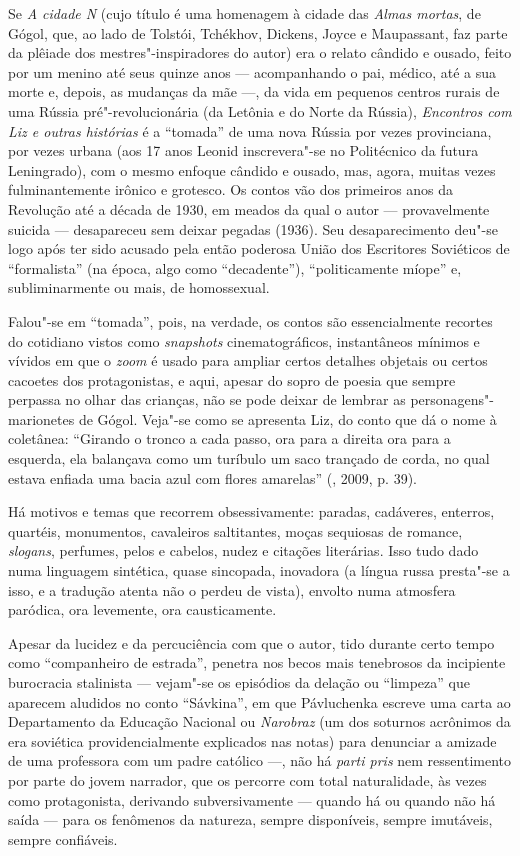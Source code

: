Se \emph{A cidade N} (cujo título é uma homenagem à cidade das
\emph{Almas mortas}, de Gógol, que, ao lado de Tolstói, Tchékhov, Dickens, Joyce e Maupassant, faz parte da plêiade dos
mestres"-inspiradores do autor) era o relato cândido e ousado, feito por
um menino até seus quinze anos --- acompanhando o pai, médico, até a sua
morte e, depois, as mudanças da mãe ---, da vida em pequenos centros
rurais de uma Rússia pré"-revolucionária (da Letônia e do Norte da
Rússia), \emph{Encontros com Liz e outras histórias} é a ``tomada'' de
uma nova Rússia por vezes provinciana, por vezes urbana (aos 17 anos
Leonid inscrevera"-se no Politécnico da futura Leningrado), com o mesmo
enfoque cândido e ousado, mas, agora, muitas vezes fulminantemente
irônico e grotesco. Os contos vão dos primeiros anos da Revolução até a
década de 1930, em meados da qual o autor --- provavelmente suicida ---
desapareceu sem deixar pegadas (1936). Seu desaparecimento deu"-se logo
após ter sido acusado pela então poderosa União dos Escritores
Soviéticos de ``formalista'' (na época, algo como ``decadente''),
``politicamente míope'' e, subliminarmente ou mais, de homossexual.

Falou"-se em ``tomada'', pois, na verdade, os contos são essencialmente
recortes do cotidiano vistos como \emph{snapshots} cinematográficos,
instantâneos mínimos e vívidos em que o \emph{zoom} é usado para ampliar
certos detalhes objetais ou certos cacoetes dos protagonistas, e aqui,
apesar do sopro de poesia que sempre perpassa no olhar das crianças, não
se pode deixar de lembrar as personagens"-marionetes de Gógol. Veja"-se
como se apresenta Liz, do conto que dá o nome à coletânea: ``Girando o
tronco a cada passo, ora para a direita ora para a esquerda, ela
balançava como um turíbulo um saco trançado de corda, no qual estava
enfiada uma bacia azul com flores amarelas'' (, 2009, p. 39).

Há motivos e temas que recorrem obsessivamente: paradas, cadáveres,
enterros, quartéis, monumentos, cavaleiros saltitantes, moças sequiosas
de romance, \emph{slogans}, perfumes, pelos e cabelos, nudez e citações
literárias. Isso tudo dado numa linguagem sintética, quase sincopada,
inovadora (a língua russa presta"-se a isso, e a tradução atenta não o
perdeu de vista), envolto numa atmosfera paródica, ora levemente, ora
causticamente.

Apesar da lucidez e da percuciência com que o autor, tido durante certo
tempo como ``companheiro de estrada'', penetra nos becos mais tenebrosos
da incipiente burocracia stalinista --- vejam"-se os episódios da delação
ou ``limpeza'' que aparecem aludidos no conto ``Sávkina'', em
que Pávluchenka escreve uma carta ao Departamento da Educação Nacional
ou \emph{Narobraz} (um dos soturnos acrônimos da era soviética
providencialmente explicados nas notas) para denunciar a amizade de uma
professora com um padre católico ---, não há \emph{parti pris} nem
ressentimento por parte do jovem narrador, que os percorre com total
naturalidade, às vezes como protagonista, derivando subversivamente ---
quando há ou quando não há saída --- para os fenômenos da natureza,
sempre disponíveis, sempre imutáveis, sempre confiáveis.

